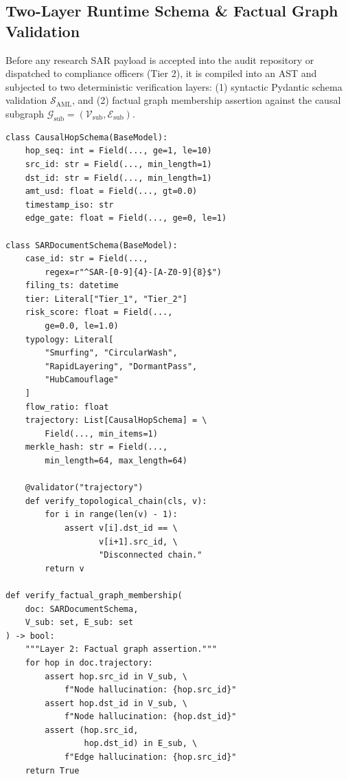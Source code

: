 \subsection{Two-Layer Runtime Schema \& Factual Graph Validation}
Before any research SAR payload is accepted into the audit repository or dispatched to compliance officers (Tier 2), it is compiled into an AST and subjected to two deterministic verification layers: (1) syntactic Pydantic schema validation $\mathcal{S}_{\text{AML}}$, and (2) factual graph membership assertion against the causal subgraph $\mathcal{G}_{\text{sub}} = (\mathcal{V}_{\text{sub}}, \mathcal{E}_{\text{sub}})$.

\begin{scriptsize}
\begin{verbatim}
class CausalHopSchema(BaseModel):
    hop_seq: int = Field(..., ge=1, le=10)
    src_id: str = Field(..., min_length=1)
    dst_id: str = Field(..., min_length=1)
    amt_usd: float = Field(..., gt=0.0)
    timestamp_iso: str
    edge_gate: float = Field(..., ge=0, le=1)

class SARDocumentSchema(BaseModel):
    case_id: str = Field(...,
        regex=r"^SAR-[0-9]{4}-[A-Z0-9]{8}$")
    filing_ts: datetime
    tier: Literal["Tier_1", "Tier_2"]
    risk_score: float = Field(...,
        ge=0.0, le=1.0)
    typology: Literal[
        "Smurfing", "CircularWash",
        "RapidLayering", "DormantPass",
        "HubCamouflage"
    ]
    flow_ratio: float
    trajectory: List[CausalHopSchema] = \
        Field(..., min_items=1)
    merkle_hash: str = Field(...,
        min_length=64, max_length=64)

    @validator("trajectory")
    def verify_topological_chain(cls, v):
        for i in range(len(v) - 1):
            assert v[i].dst_id == \
                   v[i+1].src_id, \
                   "Disconnected chain."
        return v

def verify_factual_graph_membership(
    doc: SARDocumentSchema,
    V_sub: set, E_sub: set
) -> bool:
    """Layer 2: Factual graph assertion."""
    for hop in doc.trajectory:
        assert hop.src_id in V_sub, \
            f"Node hallucination: {hop.src_id}"
        assert hop.dst_id in V_sub, \
            f"Node hallucination: {hop.dst_id}"
        assert (hop.src_id,
                hop.dst_id) in E_sub, \
            f"Edge hallucination: {hop.src_id}"
    return True
\end{verbatim}
\end{scriptsize}


